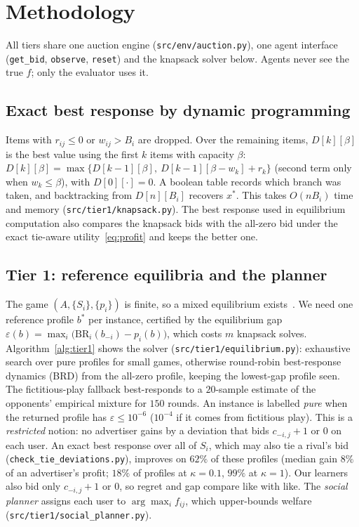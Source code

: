 \documentclass{article}
\theoremstyle{definition}
\newcommand{\BR}{\mathrm{BR}}
\begin{document}
\section{Methodology}\label{sec:method}
All tiers share one auction engine (\texttt{src/env/auction.py}), one agent interface
(\texttt{get\_bid}, \texttt{observe}, \texttt{reset}) and the knapsack solver below. Agents never see the
true $f$; only the evaluator uses it.

\subsection{Exact best response by dynamic programming}\label{sec:dp}
Items with $r_{ij}\le0$ or $w_{ij}>B_i$ are dropped. Over the remaining items, $D[k][\beta]$ is the best
value using the first $k$ items with capacity $\beta$:
$D[k][\beta]=\max\{D[k-1][\beta],\ D[k-1][\beta-w_k]+r_k\}$ (second term only when $w_k\le\beta$), with
$D[0][\cdot]=0$. A boolean table records which branch was taken, and backtracking from $D[n][B_i]$ recovers
$x^\ast$. This takes $O(nB_i)$ time and memory (\texttt{src/tier1/knapsack.py}). The best response used in
equilibrium computation also compares the knapsack bids with the all-zero bid under the exact
tie-aware utility~\eqref{eq:profit} and keeps the better one.

\subsection{Tier 1: reference equilibria and the planner}\label{sec:tier1}
The game $(A,\{S_i\},\{p_i\})$ is finite, so a mixed equilibrium exists~\citep{nash1951noncooperative}.
We need one reference profile $b^\ast$ per instance, certified by the equilibrium gap
$\varepsilon(b)=\max_i\big(\BR_i(b_{-i})-p_i(b)\big)$, which costs $m$ knapsack solves.
Algorithm~\ref{alg:tier1} shows the solver (\texttt{src/tier1/equilibrium.py}): exhaustive search over pure
profiles for small games, otherwise round-robin best-response dynamics (BRD) from the all-zero profile,
keeping the lowest-gap profile seen. The fictitious-play fallback best-responds to a $20$-sample estimate of
the opponents' empirical mixture for $150$ rounds. An instance is labelled \emph{pure} when the returned
profile has $\varepsilon\le10^{-6}$ ($10^{-4}$ if it comes from fictitious play). This is a \emph{restricted}
notion: no advertiser gains by a deviation that bids $c_{-i,j}+1$ or $0$ on each user. An exact best response
over all of $S_i$, which may also tie a rival's bid (\texttt{check\_tie\_deviations.py}), improves on $62\%$ of
these profiles (median gain $8\%$ of an advertiser's profit; $18\%$ of profiles at $\kappa=0.1$, $99\%$ at
$\kappa=1$). Our learners also bid only $c_{-i,j}+1$ or $0$, so regret and gap compare like with like.
The \emph{social planner} assigns each user to $\arg\max_i f_{ij}$, which upper-bounds welfare
(\texttt{src/tier1/social\_planner.py}).
\end{document}
